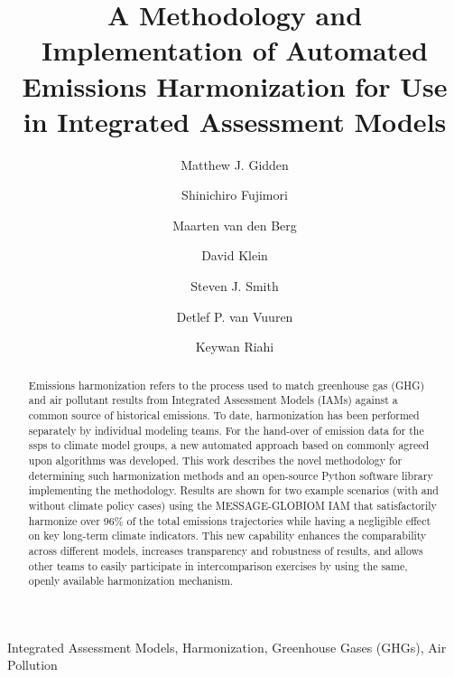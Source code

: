 \documentclass[review]{elsarticle}
\begin{document}
\begin{frontmatter}

\title{A Methodology and Implementation of Automated Emissions Harmonization for Use in Integrated Assessment Models}

\author[iiasa]{Matthew J. Gidden}

\author[nies]{Shinichiro Fujimori}
\author[pbl]{Maarten van den Berg}
\author[pik]{David Klein}
\author[pnnl]{Steven J. Smith}
\author[pbl]{Detlef P. van Vuuren}
\author[iiasa]{Keywan Riahi}

\address[iiasa]{International Institute for Applied Systems Analysis,
  Schlossplatz 1, A-2361 Laxenburg, Austria}
\address[nies]{Center for Social and Environmental Systems Research, National Institute for Environmental Studies, 16-2 Onogawa, Tsukuba, Ibaraki 305-8506, Japan}
\address[pbl]{PBL Netherlands Environmental Assessment Agency, Postbus 30314, 2500 GH The Hague, Netherlands}
\address[pik]{Potsdam Institute for Climate Impact Research (PIK), Member of the Leibniz Association, P.O. Box 60 12 03, D-14412 Potsdam, Germany}
\address[pnnl]{Joint Global Change Research Institute, 5825 University Research Court, Suite 3500, College Park, MD 20740}

\begin{abstract}
Emissions harmonization refers to the process used to match greenhouse gas (GHG)
and air pollutant results from Integrated Assessment Models (IAMs) against a
common source of historical emissions. To date, harmonization has been performed
separately by individual modeling teams. For the hand-over of emission data for
the \gls{ssps} to climate model groups, a new automated approach based on
commonly agreed upon algorithms was developed. This work describes the novel
methodology for determining such harmonization methods and an open-source Python
software library implementing the methodology. Results are shown for two example
scenarios (with and without climate policy cases) using the MESSAGE-GLOBIOM IAM
that satisfactorily harmonize over 96\% of the total emissions trajectories
while having a negligible effect on key long-term climate indicators. This new
capability enhances the comparability across different models, increases
transparency and robustness of results, and allows other teams to easily
participate in intercomparison exercises by using the same, openly available
harmonization mechanism.
\end{abstract}

\begin{keyword}
Integrated Assessment Models, Harmonization, Greenhouse Gases (GHGs), Air Pollution 
\end{keyword}

\end{frontmatter}
\end{document}
